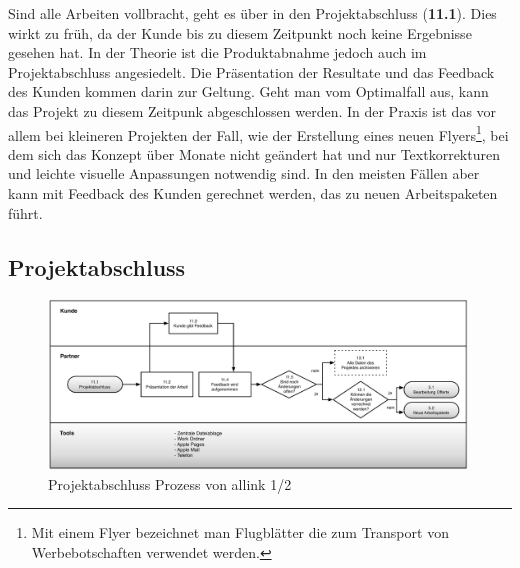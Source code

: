 Sind alle Arbeiten vollbracht, geht es über in den Projektabschluss (\textbf{11.1}). Dies wirkt
zu früh, da der Kunde bis zu diesem Zeitpunkt noch keine Ergebnisse gesehen
hat. In der Theorie ist die Produktabnahme jedoch auch im Projektabschluss angesiedelt.
Die Präsentation der Resultate und das Feedback des Kunden kommen darin zur Geltung. 
Geht man vom Optimalfall aus, kann das Projekt zu diesem Zeitpunk abgeschlossen 
werden. In der Praxis ist das vor allem bei kleineren Projekten der Fall, wie 
der Erstellung eines neuen Flyers\footnote{Mit einem Flyer bezeichnet man Flugblätter
die zum Transport von Werbebotschaften verwendet werden.}, bei dem sich das Konzept 
über Monate nicht geändert hat und nur Textkorrekturen und leichte visuelle 
Anpassungen notwendig sind. In den meisten Fällen aber kann mit Feedback des
Kunden gerechnet werden, das zu neuen Arbeitspaketen führt.

\clearpage

\subsection{Projektabschluss}

\begin{figure}[p]
\begin{center}
\includegraphics[width=0.99\textwidth,angle=0]{./bilder/analyse/03_ist_prozesse_abschluss_01.pdf}
\caption[Projektabschluss Prozess von allink 1/2]{Projektabschluss 
    Prozess von allink 1/2\footnotemark}
\label{pic:03_ist_prozesse_abschluss_01}
\end{center}
\end{figure}

